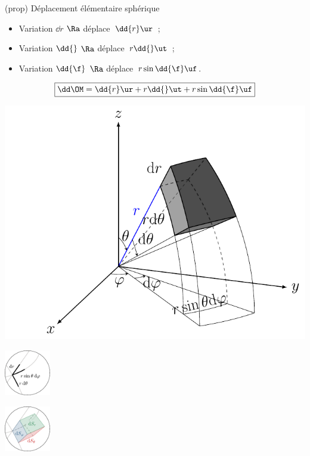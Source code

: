 \documentclass[../../main/main.tex]{subfiles}
\begin{document}
\begin{tcb*}[sidebyside, righthand ratio=.5](prop)
	{Déplacement élémentaire sphérique}
	\begin{itemize}
		\item Variation $\dd{r}$ $\Ra$ déplace\mnt\ $\dd{r}\ur$~;
		\item Variation $\dd{\tt}$ $\Ra$ déplace\mnt\ $r\dd{\tt}\ut$~;
		\item Variation $\dd{\f}$ $\Ra$ déplace\mnt\ $r\sin\tt\dd{\f}\uf$.
	\end{itemize}
	\[\boxed{\dd\OM = \dd{r}\ur + r\dd{\tt}\ut + r\sin\tt\dd{\f}\uf}\]
	\tcblower
	\noindent
	\begin{minipage}{.59\linewidth}
		\begin{center}
			\includegraphics[width=\linewidth]{sph_vol}
			\captionsetup{justification=centering}
		\end{center}
	\end{minipage}
	\begin{minipage}{.39\linewidth}
		\begin{center}
			\includegraphics[height=2cm]{zoom_sph_lgn}
		\end{center}
		\begin{center}
			\includegraphics[height=2cm]{zoom_sph_sfc}
			\captionsetup{justification=centering}
		\end{center}
	\end{minipage}
\end{tcb*}
\end{document}
